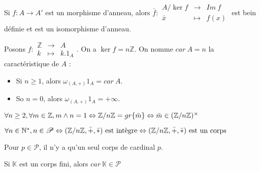 \begin{theo} Si $f:A\rightarrow A'$ est un morphisme d'anneau, alors $\bar{f}:\begin{array}{ccc} A/\ker f & \rightarrow & Im\ f \\ \bar{x} & \mapsto & f(x)\end{array}$ est bein définie et est un isomorphisme d'anneau.
\end{theo}

\begin{defi}[Caractéristique] Posons $f:\begin{array}{ccc} \mathbb{Z} & \rightarrow & A \\ k & \mapsto & k.1_A \end{array}$. On a $\ker f = n\mathbb{Z}$. On nomme $car\ A = n$ la caractéristique de $A$ :\begin{itemize}
    \item Si $n \geq 1$, alors $\omega_{(A,+)}1_A = car\ A$.
    \item So $n = 0$, alors $\omega_{(A,+)}1_A = +\infty$.
\end{itemize}\end{defi}

\begin{prop}$\forall n \geq 2, \forall m \in \mathbb{Z}, m\wedge n = 1 \Leftrightarrow \mathbb{Z}/n\mathbb{Z} = gr\{\bar{m}\} \Leftrightarrow \bar{m}\in(\mathbb{Z}/n\mathbb{Z})^\times$
\end{prop}

\begin{prop}$\forall n\in\mathbb{N}^*, n\in\mathscr{P} \Leftrightarrow (\mathbb{Z}/n\mathbb{Z}, \bar{+}, \bar{*})\text{ est intègre} \Leftrightarrow(\mathbb{Z}/n\mathbb{Z}, \bar{+}, \bar{*}) \text{ est un corps}$
\end{prop}

\begin{prop}Pour $p\in\mathscr{P}$, il n'y a qu'un seul corps de cardinal $p$.
\end{prop}

\begin{prop}Si $\mathbb{K}$ est un corps fini, alors $car\ \mathbb{K}\in\mathscr{P}$
\end{prop}

